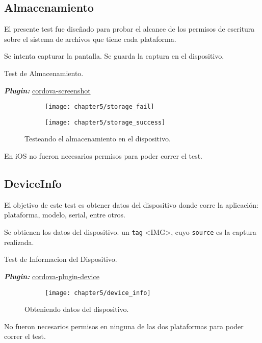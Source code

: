 \subsection{Almacenamiento}
El presente test fue diseñado para probar el alcance de los permisos de escritura sobre el sistema de archivos que tiene cada plataforma.\\
\begin{algorithm}
	\begin{algorithmic}[1]
		\STATE Se intenta capturar la pantalla.
		\STATE Se guarda la captura en el dispositivo.
		
	\end{algorithmic}
	\caption{Test de Almacenamiento.}\label{alg:chap5_test_storage}
\end{algorithm}
\textbf{\emph{Plugin:}} \href{https://github.com/gitawego/cordova-screenshot}{cordova-screenshot}\\
\begin{figure}[hbtp]
   \centering
   	\begin{subfigure}{.3\linewidth}
		\texttt{[image: chapter5/storage\_fail]}
		\label{fig:ch05:storage_fail}
	\end{subfigure}
	\begin{subfigure}{.3\linewidth}
		\texttt{[image: chapter5/storage\_success]}
		\label{fig:ch05:storage_success}
	\end{subfigure}
	\caption{Testeando el almacenamiento en el dispositivo.}
	\label{fig:ch05:storage_test}
\end{figure}
En iOS no fueron necesarios permisos para poder correr el test.
\newpage
\subsection{DeviceInfo}
El objetivo de este test es obtener datos del dispositivo donde corre la aplicación: plataforma, modelo, serial, entre otros.\\
\begin{algorithm}
	\begin{algorithmic}[1]
		\STATE Se obtienen los datos del dispositivo.
		\RETURN un \texttt{tag} \textless IMG\textgreater, cuyo \texttt{source} es la captura realizada.
	\end{algorithmic}
	\caption{Test de Informacion del Dispositivo.}\label{alg:chap5_test_info}
\end{algorithm}
\textbf{\emph{Plugin:}} \href{https://www.npmjs.com/package/cordova-plugin-device}{cordova-plugin-device}\\
\begin{figure}[hbtp]
   \centering
   	\begin{subfigure}{.3\linewidth}
		\texttt{[image: chapter5/device\_info]}
		\label{fig:ch05:device-info-success}
	\end{subfigure}
	\caption{Obteniendo datos del dispositivo.}
	\label{fig:ch05:device-info}
\end{figure}
No fueron necesarios permisos en ninguna de las dos plataformas para poder correr el test.
\newpage
